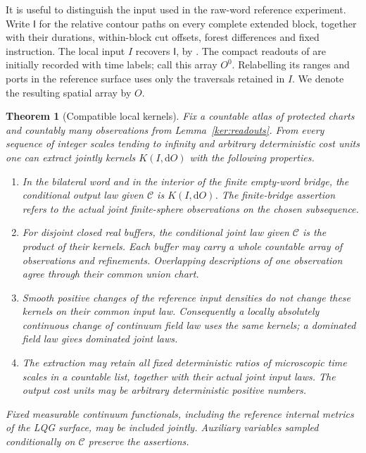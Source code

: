 \documentclass[11pt]{article}
\numberwithin{equation}{section}
\newtheorem{theorem}{Theorem}[section]
\theoremstyle{definition}
\theoremstyle{remark}
\newcommand{\1}{\mathbf 1}
\begin{document}
It is useful to distinguish the input used in the raw-word reference
experiment. Write \(\mathsf I\) for the relative contour paths on every
complete extended block, together with their durations, within-block
cut offsets, forest
differences and fixed instruction. The local input \(I\) recovers
\(\mathsf I\), by . The compact readouts of
 are initially recorded with time labels; call this
array \(O^0\). Relabelling its ranges and ports in the reference surface
uses only the traversals retained in \(I\). We denote the resulting
spatial array by \(O\).

\begin{theorem}[Compatible local kernels]\label{ker:local-kernels}
Fix a countable atlas of protected charts and countably many
observations from Lemma~\ref{ker:readouts}.  From every sequence of
integer scales tending to infinity and arbitrary deterministic cost
units one can extract jointly kernels \(K(I,\mathrm d O)\) with the following
properties.
\begin{enumerate}
\item In the bilateral word and in the interior of the finite
empty-word bridge, the conditional output law given \(\mathcal C\)
is \(K(I,\mathrm d O)\).  The finite-bridge assertion refers to the actual
joint finite-sphere observations on the chosen subsequence.
\item For disjoint closed real buffers, the conditional joint law
given \(\mathcal C\) is the product of their kernels.  Each buffer may
carry a whole countable array of observations and refinements.
Overlapping descriptions of one observation agree through their
common union chart.
\item Smooth positive changes of the reference input densities do
not change these kernels on their common input law.  Consequently a
locally absolutely continuous change of continuum field law uses the
same kernels; a dominated field law gives dominated joint laws.
\item The extraction may retain all fixed deterministic ratios of
microscopic time scales in a countable list, together with their
actual joint input laws. The output cost units may be arbitrary
deterministic positive numbers.
\end{enumerate}
Fixed measurable continuum functionals, including the reference
internal metrics of the LQG surface, may be included jointly. Auxiliary
variables sampled conditionally on \(\mathcal C\) preserve the assertions.
\end{theorem}
\end{document}
